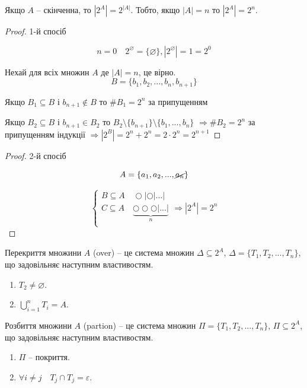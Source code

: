 \begin{theorem}
    Якщо $A$ -- скінченна, то $|2^A| = 2^{|A|}$. Тобто, якщо $|A| = n$ то $|2^A| = 2^n$.
\end{theorem}
\begin{proof}
    1-й спосіб

    $$n = 0 \quad 2^{\varnothing} = \{\varnothing\}, |2^{\varnothing}| = 1 = 2^0$$
    
    Нехай для всіх множин $A$ де $|A| = n$, це вірно.
    $$B = \{b_1, b_2, ..., b_n, b_{n+1}\}$$

    Якщо $B_1 \subseteq B$ і $b_{n+1} \not\in B$
    то $\#B_1 = 2^n$ за припущенням
    
    Якщо $B_2 \subseteq B$ і $b_{n+1} \in B_2$
    то $B_2 \setminus \{b_{n+1}\} \setminus \{b_1, ..., b_n\}$
    $\Rightarrow \# B_2 = 2^n$ за припущенням індукції
    $\Rightarrow |2^B| = 2^n + 2^n = 2 \cdot 2^n = 2^{n+1}$
    
\end{proof}
\begin{proof}
    2-й спосіб

    $$A = \{a_1, a_2, ..., \cancel{a_n}\}$$

    $$\left\{ \begin{array}{l}
        B \subseteq A \quad \bigcirc | \bigcirc | ... | \\
        C \subseteq A \quad \underbrace{\bigcirc  \bigcirc \bigcirc | ... |}_{n} \\
    \end{array} \right. \Rightarrow |2^A| = 2^n$$
\end{proof}

\begin{definition}
    Перекриття множини $A$ (over) -- це система множин $\Delta \subseteq 2^A$, $\Delta = \{T_1, T_2, ..., T_n\}$, що задовільняє наступним властивостям.
    \begin{enumerate}
        \item $T_2 \neq \varnothing$.
        \item $\bigcup\limits_{i=1}^{n} T_i = A$.
    \end{enumerate}
\end{definition}

\begin{definition}
    Розбиття множини $A$ (partion) -- це система множин $\Pi = \{T_1, T_2, ..., T_n\}$, $\Pi \subseteq 2^A$, що задовільняє наступним властивостям.
    \begin{enumerate}
        \item $\Pi$ -- покриття.
        \item $\forall i \neq j \quad T_j \cap T_j = \varepsilon$.
    \end{enumerate}
\end{definition}

